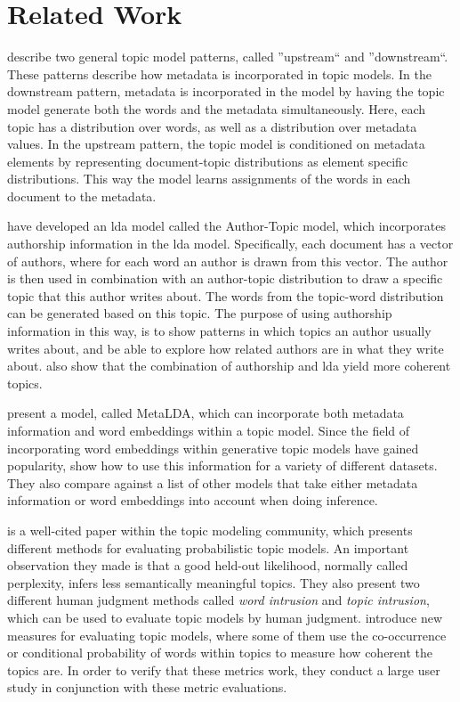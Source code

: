 \section{Related Work}\label{sec:related_work}

\citet{mimno2008topic} describe two general topic model patterns, called ''upstream`` and ''downstream``.
These patterns describe how metadata is incorporated in topic models.
In the downstream pattern, metadata is incorporated in the model by having the topic model generate both the words and the metadata simultaneously.
Here, each topic has a distribution over words, as well as a distribution over metadata values.
In the upstream pattern, the topic model is conditioned on metadata elements by representing document-topic distributions as element specific distributions.
This way the model learns assignments of the words in each document to the metadata.

\citet{author_topic_2012} have developed an \gls{lda} model called the Author-Topic model, which incorporates authorship information in the \gls{lda} model.
Specifically, each document has a vector of authors, where for each word an author is drawn from this vector.
The author is then used in combination with an author-topic distribution to draw a specific topic that this author writes about.
The words from the topic-word distribution can be generated based on this topic.
The purpose of using authorship information in this way, is to show patterns in which topics an author usually writes about, and be able to explore how related authors are in what they write about.
\citeauthor{author_topic_2012} also show that the combination of authorship and \gls{lda} yield more coherent topics.

\citet{MetaLDA2017} present a model, called MetaLDA, which can incorporate both metadata information and word embeddings within a topic model.
Since the field of incorporating word embeddings within generative topic models have gained popularity\cite{dieng2020topic}, \citet{MetaLDA2017} show how to use this information for a variety of different datasets.
They also compare against a list of other models that take either metadata information or word embeddings into account when doing inference.

\citet{tea_leaves} is a well-cited paper within the topic modeling community, which presents different methods for evaluating probabilistic topic models. 
An important observation they made is that a good held-out likelihood, normally called perplexity, infers less semantically meaningful topics.
They also present two different human judgment methods called \emph{word intrusion} and \emph{topic intrusion}, which can be used to evaluate topic models by human judgment. 
\citet{topic_coherence_2015} introduce new measures for evaluating topic models, where some of them use the co-occurrence or conditional probability of words within topics to measure how coherent the topics are. 
In order to verify that these metrics work, they conduct a large user study in conjunction with these metric evaluations.

